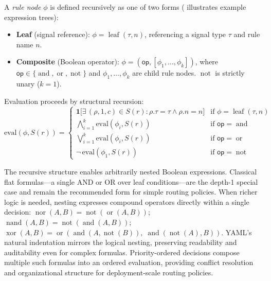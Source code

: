 \begin{definition}
A \emph{rule node} $\phi$ is defined recursively as one of two forms ( illustrates example expression trees):
\begin{itemize}[nosep,leftmargin=1.5em]
  \item \textbf{Leaf} (signal reference): $\phi = \operatorname{leaf}(\tau, n)$, referencing a signal type $\tau$ and rule name $n$.
  \item \textbf{Composite} (Boolean operator): $\phi = (\mathsf{op}, [\phi_1, \ldots, \phi_k])$, where $\mathsf{op} \in \{\operatorname{and}, \operatorname{or}, \operatorname{not}\}$ and $\phi_1, \ldots, \phi_k$ are child rule nodes. $\operatorname{not}$ is strictly unary ($k = 1$).
\end{itemize}
Evaluation proceeds by structural recursion:
\begin{equation}
  \text{eval}(\phi, S(r)) =
  \begin{cases}
    \mathbf{1}\bigl[\exists\, (\rho, 1, c) \in S(r) : \rho.\tau = \tau \wedge \rho.n = n\bigr]
      & \text{if } \phi = \operatorname{leaf}(\tau, n) \\[4pt]
    \bigwedge_{i=1}^{k} \text{eval}(\phi_i, S(r))
      & \text{if } \mathsf{op} = \operatorname{and} \\[4pt]
    \bigvee_{i=1}^{k} \text{eval}(\phi_i, S(r))
      & \text{if } \mathsf{op} = \operatorname{or} \\[4pt]
    \neg\, \text{eval}(\phi_1, S(r))
      & \text{if } \mathsf{op} = \operatorname{not}
  \end{cases}
\end{equation}
\end{definition}

The recursive structure enables arbitrarily nested Boolean expressions.
Classical flat formulas---a single AND or OR over leaf conditions---are the depth-1 special case and remain the recommended form for simple routing policies.
When richer logic is needed, nesting expresses compound operators directly within a single decision:
$\operatorname{nor}(A,B) = \operatorname{not}(\operatorname{or}(A,B))$;
$\operatorname{nand}(A,B) = \operatorname{not}(\operatorname{and}(A,B))$;
$\operatorname{xor}(A,B) = \operatorname{or}(\operatorname{and}(A, \operatorname{not}(B)),\; \operatorname{and}(\operatorname{not}(A), B))$.
YAML's natural indentation mirrors the logical nesting, preserving readability and auditability even for complex formulas.
Priority-ordered decisions compose multiple such formulas into an ordered evaluation, providing conflict resolution and organizational structure for deployment-scale routing policies.

